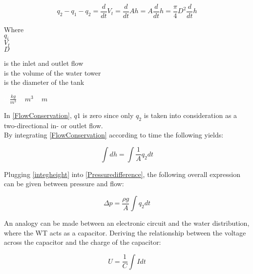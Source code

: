 \begin{equation}
  q_{2} - q_{1} - q_2 = \frac{d}{dt}V_t = \frac{d}{dt}Ah = A \frac{d}{dt}h = \frac{\pi}{4} D^2 \frac{d}{dt} h
  \label{FlowConservation}
\end{equation}

\begin{minipage}[t]{0.20\textwidth}
Where\\
\hspace*{8mm} $q_i$ \\
\hspace*{8mm} $V_t$ \\
\hspace*{8mm} $D$ 
\end{minipage}
\begin{minipage}[t]{0.68\textwidth}
\vspace*{2mm}
is the inlet and outlet flow\\
is the volume of the water tower\\
is the diameter of the tank 
\end{minipage}
\begin{minipage}[t]{0.10\textwidth}
\vspace*{2mm}
\textcolor{White}{te}$\unit{\frac{kg}{m^3}}$
\textcolor{White}{te}$\unit{m^3}$
\textcolor{White}{te}$\unit{m}$
\end{minipage}

In \eqref{FlowConservation}, $q1$ is zero since only $q_2$ is taken into consideration as a two-directional in- or outlet flow. 
\\
By integrating \eqref{FlowConservation} according to time the following yields:

\begin{equation}
  \int dh = \int \frac{1}{A} q_2 dt
  \label{integheight}
\end{equation}

Plugging \eqref{integheight} into \eqref{Pressuredifference}, the following overall expression can be given between pressure and flow: 

\begin{equation}
\label{WTequation}
  \Delta p =  \frac{\rho g}{A}  \int   q_2 dt
\end{equation}

An analogy can be made between an electronic circuit and the water distribution, where the WT acts as a capacitor.  Deriving the relationship between the voltage across the capacitor and the 
charge of the capacitor:

\begin{equation}
  U = \frac{1}{C} \int I dt
  \label{ElecCircuirt}
\end{equation}

